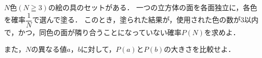 \documentclass[../../main.tex]{subfiles}
\begin{document}
$N$色$(N\geqq3)$の絵の具のセットがある．
一つの立方体の面を各面独立に，各色を確率$\displaystyle\dfrac{1}{N}$で選んで塗る．
このとき，塗られた結果が，使用された色の数が3以内で，かつ，同色の面が隣り合うことになっていない確率$P(N)$を求めよ．

また，$N$の異なる値$a$，$b$に対して，$P(a)$と$P(b)$の大きさを比較せよ．
\end{document}
